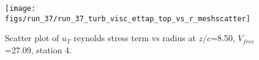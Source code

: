 \begin{figure}[H]
\centering
\texttt{[image: figs/run\_37/run\_37\_turb\_visc\_ettap\_top\_vs\_r\_meshscatter]}
\caption{Scatter plot of $
u_T$ reynolds stress term vs radius at $z/c$=8.50, $V_{free}$=27.09, station 4.}
\label{fig:run_37_turb_visc_ettap_top_vs_r_meshscatter}
\end{figure}


